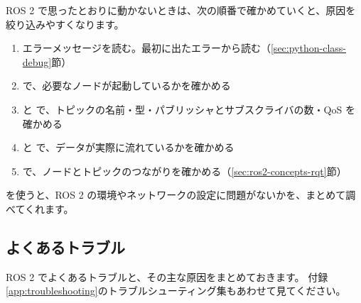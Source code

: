 ROS 2 で思ったとおりに動かないときは、次の順番で確かめていくと、原因を絞り込みやすくなります。

\begin{enumerate}
  \item エラーメッセージを読む。最初に出たエラーから読む（\ref{sec:python-class-debug}節）
  \item {} で、必要なノードが起動しているかを確かめる
  \item {} と  で、トピックの名前・型・パブリッシャとサブスクライバの数・QoS を確かめる
  \item {} と  で、データが実際に流れているかを確かめる
  \item {} で、ノードとトピックのつながりを確かめる（\ref{sec:ros2-concepts-rqt}節）
\end{enumerate}

 を使うと、ROS 2 の環境やネットワークの設定に問題がないかを、まとめて調べてくれます。


\subsection{よくあるトラブル}

ROS 2 でよくあるトラブルと、その主な原因をまとめておきます。
付録\ref{app:troubleshooting}のトラブルシューティング集もあわせて見てください。

